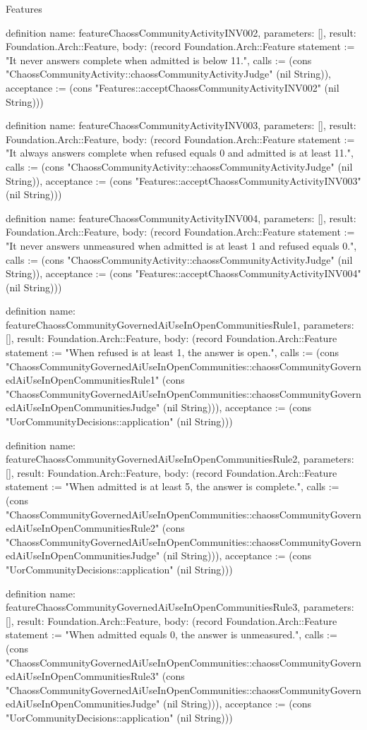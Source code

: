\begin{lexlean}{Features}
\begin{semanticmodule}
definition{
  name: featureChaossCommunityActivityINV002,
  parameters: [],
  result: Foundation.Arch::Feature,
  body: (record Foundation.Arch::Feature {statement := "It never answers complete when admitted is below 11.", calls := (cons "ChaossCommunityActivity::chaossCommunityActivityJudge" (nil String)), acceptance := (cons "Features::acceptChaossCommunityActivityINV002" (nil String))})
}

definition{
  name: featureChaossCommunityActivityINV003,
  parameters: [],
  result: Foundation.Arch::Feature,
  body: (record Foundation.Arch::Feature {statement := "It always answers complete when refused equals 0 and admitted is at least 11.", calls := (cons "ChaossCommunityActivity::chaossCommunityActivityJudge" (nil String)), acceptance := (cons "Features::acceptChaossCommunityActivityINV003" (nil String))})
}

definition{
  name: featureChaossCommunityActivityINV004,
  parameters: [],
  result: Foundation.Arch::Feature,
  body: (record Foundation.Arch::Feature {statement := "It never answers unmeasured when admitted is at least 1 and refused equals 0.", calls := (cons "ChaossCommunityActivity::chaossCommunityActivityJudge" (nil String)), acceptance := (cons "Features::acceptChaossCommunityActivityINV004" (nil String))})
}

definition{
  name: featureChaossCommunityGovernedAiUseInOpenCommunitiesRule1,
  parameters: [],
  result: Foundation.Arch::Feature,
  body: (record Foundation.Arch::Feature {statement := "When refused is at least 1, the answer is open.", calls := (cons "ChaossCommunityGovernedAiUseInOpenCommunities::chaossCommunityGovernedAiUseInOpenCommunitiesRule1" (cons "ChaossCommunityGovernedAiUseInOpenCommunities::chaossCommunityGovernedAiUseInOpenCommunitiesJudge" (nil String))), acceptance := (cons "UorCommunityDecisions::application" (nil String))})
}

definition{
  name: featureChaossCommunityGovernedAiUseInOpenCommunitiesRule2,
  parameters: [],
  result: Foundation.Arch::Feature,
  body: (record Foundation.Arch::Feature {statement := "When admitted is at least 5, the answer is complete.", calls := (cons "ChaossCommunityGovernedAiUseInOpenCommunities::chaossCommunityGovernedAiUseInOpenCommunitiesRule2" (cons "ChaossCommunityGovernedAiUseInOpenCommunities::chaossCommunityGovernedAiUseInOpenCommunitiesJudge" (nil String))), acceptance := (cons "UorCommunityDecisions::application" (nil String))})
}

definition{
  name: featureChaossCommunityGovernedAiUseInOpenCommunitiesRule3,
  parameters: [],
  result: Foundation.Arch::Feature,
  body: (record Foundation.Arch::Feature {statement := "When admitted equals 0, the answer is unmeasured.", calls := (cons "ChaossCommunityGovernedAiUseInOpenCommunities::chaossCommunityGovernedAiUseInOpenCommunitiesRule3" (cons "ChaossCommunityGovernedAiUseInOpenCommunities::chaossCommunityGovernedAiUseInOpenCommunitiesJudge" (nil String))), acceptance := (cons "UorCommunityDecisions::application" (nil String))})
}


\end{semanticmodule}
\end{lexlean}
